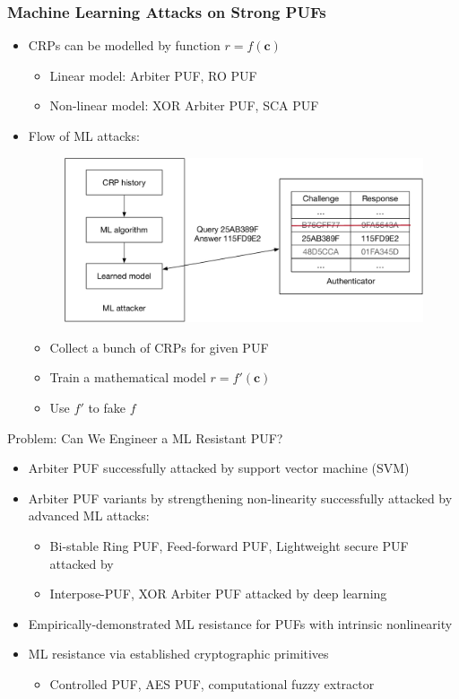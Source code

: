\begin{frame}
\frametitle{Machine Learning Attacks on Strong PUFs}
\begin{itemize}
    \item CRPs can be modelled by function $r=f(\mathbf{c})$
        \begin{itemize}
            \item Linear model: Arbiter PUF, RO PUF
            \item Non-linear model: XOR Arbiter PUF, SCA PUF
        \end{itemize}
    \item Flow of ML attacks:
    \begin{figure}
    \centering
    \includegraphics[width=.8\linewidth]{fig/ML Attack.pdf}
    \end{figure}
        \begin{itemize}
            \item Collect a bunch of CRPs for given PUF 
            \item Train a mathematical model $r = f'(\mathbf{c})$
            \item Use $f'$ to fake $f$
        \end{itemize}
\end{itemize}
\end{frame}

\begin{frame}{Problem: Can We Engineer a ML Resistant PUF?}
\begin{itemize}
    \item Arbiter PUF successfully attacked by support vector machine (SVM)
    \item Arbiter PUF variants by strengthening non-linearity successfully attacked by advanced ML attacks:
        \begin{itemize}
            \item Bi-stable Ring PUF, Feed-forward PUF, Lightweight secure PUF attacked by
            \item Interpose-PUF, XOR Arbiter PUF attacked by deep learning
        \end{itemize}
    \item Empirically-demonstrated ML resistance for PUFs with intrinsic nonlinearity 
    \item ML resistance via established cryptographic primitives
        \begin{itemize}
            \item Controlled PUF, AES PUF, computational fuzzy extractor
        \end{itemize}
\end{itemize}    
\end{frame}

